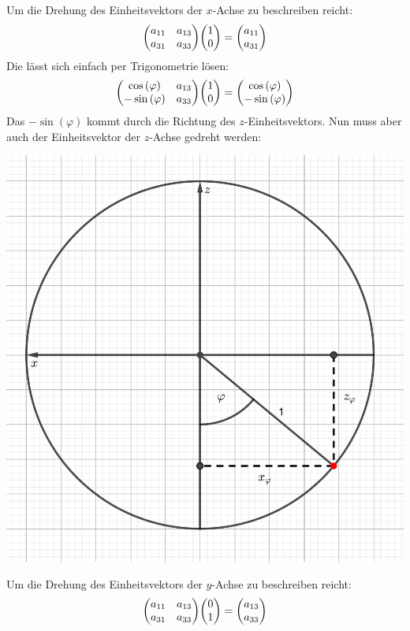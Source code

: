 \documentclass{theozettel}
\begin{document}
Um die Drehung des Einheitsvektors der $x$-Achse zu beschreiben reicht:
\begin{align*}
\mqty(a_{11} & a_{13}\\ a_{31} &a_{33})\mqty(1 \\ 0)=\mqty(a_{11}\\ a_{31})
\end{align*}
Die lässt sich einfach per Trigonometrie lösen:
\begin{align*}
\mqty(\cos\left(\varphi\right) & a_{13}\\ -\sin\left(\varphi\right) &a_{33})\mqty(1 \\ 0)=\mqty(\cos\left(\varphi\right)\\-\sin\left(\varphi\right))
\end{align*}
Das $-\sin\left(\varphi\right)$ kommt durch die Richtung des $z$-Einheitsvektors.
Nun muss aber auch der Einheitsvektor der $z$-Achse gedreht werden:
\begin{center}
\includegraphics[scale=0.4]{Theo07-4b)_2.pdf}
\end{center}
Um die Drehung des Einheitsvektors der $y$-Achse zu beschreiben reicht:
\begin{align*}
\mqty(a_{11} & a_{13}\\ a_{31} &a_{33})\mqty(0 \\ 1)=\mqty(a_{13}\\ a_{33})
\end{align*}
\end{document}
